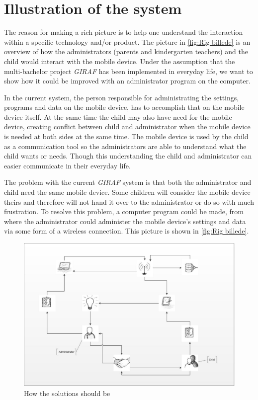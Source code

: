\section{Illustration of the system}
The reason for making a rich picture is to help one understand the interaction within a specific technology and/or product. The picture in \vref{fig:Rig billede} is an overview of how the administrators (parents and kindergarten teachers) and the child would interact with the mobile device. Under the assumption that the multi-bachelor project \textit{GIRAF} has been implemented in everyday life, we want to show how it could be improved with an administrator program on the computer.

In the current system, the person responsible for administrating the settings, programs and data on the mobile device, has to accomplish that on the mobile device itself. At the same time the child may also have need for the mobile device, creating conflict between child and administrator when the mobile device is needed at both sides at the same time. The mobile device is used by the child as a communication tool so the administrators are able to understand what the child wants or needs. 
Though this understanding the child and administrator can easier communicate in their everyday life.%

The problem with the current \textit{GIRAF} system is that both the administrator and child need the same mobile device. Some children will consider the mobile device theirs and therefore will not hand it over to the administrator or do so with much frustration. To resolve this problem, a computer program could be made, from where the administrator could administer the mobile device's settings and data via some form of a wireless connection. This picture is shown in \vref{fig:Rig billede}. 

\begin{figure}[ht]
	\centering
		\includegraphics[width=1.00\textwidth]{img/Rig_billede.jpg}
	\caption{How the solutions should be}
	\label{fig:Rig billede}
\end{figure}


